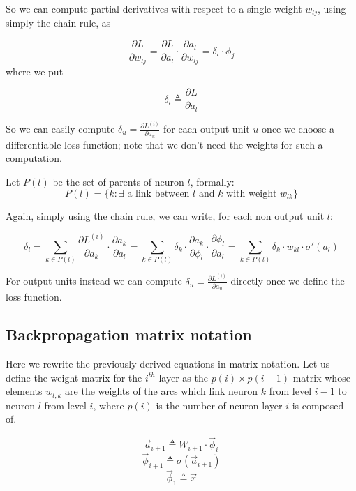 So we can compute partial derivatives with respect to a single weight $w_{lj}$, using simply the chain rule, as 

$$\frac{\partial L}{\partial w_{lj}}=\frac{\partial L}{\partial a_l} \cdot \frac{\partial a_l}{\partial w_{lj}}=\delta_l \cdot \phi_j$$
where we put

\begin{equation}
\delta_l \triangleq \frac{\partial L}{\partial a_l}
\end{equation}



So we can easily compute $\delta_u = \frac{\partial L^{(i)}}{\partial a_u} $ for each output unit $u$ once we choose a differentiable loss function; note
that we don't need the weights for such a computation. 

Let $P(l)$ be the set of parents of neuron $l$, formally:
\begin{equation} 
P(l) = \{ k: \exists \text{ a link between $l$ and $k$ with weight } w_{lk} \}
\end{equation}

Again, simply using the chain rule, we can write, for each non output unit $l$:

\begin{equation}
\label{loss_deriv}
\delta_l = \sum_{k\in P(l)} \frac{\partial L^{(i)}}{\partial a_k} \cdot \frac{\partial a_k}{\partial a_l}= \sum_{k\in P(l)} \delta_k \cdot 
\frac{\partial a_k}{\partial \phi_l} \cdot \frac{\partial \phi_l}{\partial a_l} = \sum_{k\in P(l)} \delta_k \cdot 
w_{kl} \cdot \sigma'(a_l)
\end{equation}


For output units instead we can compute $\delta_u = \frac{\partial L^{(i)}}{\partial a_u} $ directly once we define the loss function.

\subsection{Backpropagation matrix notation}

Here we rewrite the previously derived equations in matrix notation.
Let us define the weight matrix for the $i^{th}$ layer as the $p(i) \times p(i-1)$ matrix whose elements $w_{l,k}$ are the weights of the arcs which link neuron $k$ from level $i-1$ to neuron $l$ from level $i$, where
$p(i)$ is the number of neuron layer $i$ is composed of.

\begin{equation}
 \vec{a}_{i+1} \triangleq W_{i+1} \cdot \vec{\phi}_i
\end{equation}
\begin{equation}
 \vec{\phi}_{i+1} \triangleq \sigma(\vec{a}_{i+1})
\end{equation}
\begin{equation}
 \vec{\phi}_1 \triangleq \vec{x}
\end{equation}

